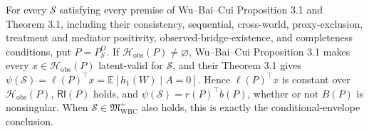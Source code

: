 For every \(\mathcal S\) satisfying every premise of Wu--Bai--Cui Proposition 3.1 and Theorem 3.1, including their consistency, sequential, cross-world, proxy-exclusion, treatment and mediator positivity, observed-bridge-existence, and completeness conditions, put \(P=P_{\mathcal S}^O\). If \(\mathcal H_{\mathrm{obs}}(P)\neq\varnothing\), Wu--Bai--Cui Proposition 3.1 makes every \(x\in\mathcal H_{\mathrm{obs}}(P)\) latent-valid for \(\mathcal S\), and their Theorem 3.1 gives \(\psi(\mathcal S)=\ell(P)^{\top}x=\mathbb E[h_1(W)\mid A=0]\). Hence \(\ell(P)^{\top}x\) is constant over \(\mathcal H_{\mathrm{obs}}(P)\), \(\mathsf{RI}(P)\) holds, and \(\psi(\mathcal S)=r(P)^{\top}b(P)\), whether or not \(B(P)\) is nonsingular. When \(\mathcal S\in\mathfrak M_{\mathrm{WBC}}^{+}\) also holds, this is exactly the conditional-envelope conclusion.